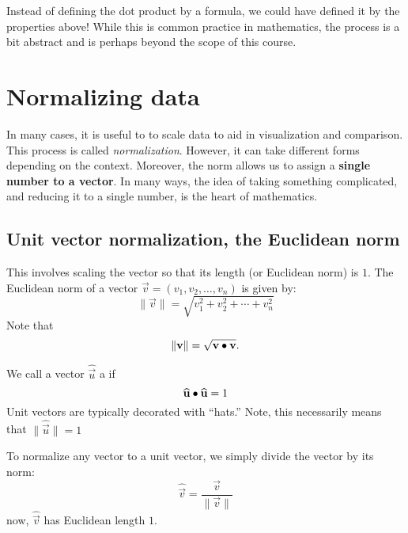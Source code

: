 \documentclass{ximera}
\begin{document}
Instead of defining the dot product by a formula, we could have
defined it by the properties above!  While this is common practice in
mathematics, the process is a bit abstract and is perhaps beyond the
scope of this course.






\section{Normalizing data}

In many cases, it is useful to to scale data to aid in visualization
and comparison. This process is called
\textit{normalization}. However, it can take different forms depending
on the context. Moreover, the norm allows us to assign a
\textbf{single number to a vector}. In many ways, the idea of taking
something complicated, and reducing it to a single number, is the
heart of mathematics.



\subsection{Unit vector normalization, the Euclidean norm}

This involves scaling the vector so that its length (or Euclidean
norm) is $1$. The Euclidean norm of a vector \(\vec{v} = (v_1, v_2,
\ldots, v_n)\) is given by:
\[
\|\vec{v}\| = \sqrt{v_1^2 + v_2^2 + \cdots + v_n^2}
\]
Note that
\[
\|\mathbf{v}\| = \sqrt{\mathbf{v}\bullet\mathbf{v}}.
\]
\begin{definition}
  We call a vector $\hat{\vec u}$ a  if
  \[
  \widehat{\mathbf{u}} \bullet \widehat{\mathbf{u}} =1
  \]
  Unit vectors are typically decorated with ``hats.'' Note, this
  necessarily means that $\|\hat{\vec{u}}\| = 1$
\end{definition}



To normalize any vector to a unit vector, we simply divide the vector
by its norm:
\[
\hat{\vec{v}} = \frac{\vec{v}}{\|\vec{v}\|}
\]
now, $\hat{\vec{v}}$ has Euclidean length $1$.
\end{document}
